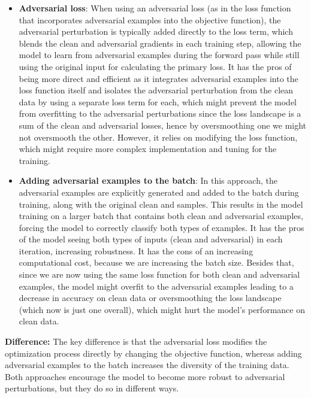 \documentclass{article}
\begin{document}
\begin{itemize}
    \item \textbf{Adversarial loss}: When using an adversarial loss (as in the loss function that incorporates adversarial examples
    into the objective function), the adversarial perturbation is typically added directly to the loss term, which blends
    the clean and adversarial gradients in each training step, allowing the model to learn from adversarial examples
    during the forward pass while still using the original input for calculating the primary loss. It has the pros of
    being more direct and efficient as it integrates adversarial examples into the loss function itself and isolates
    the adversarial perturbation from the clean data by using a separate loss term for each, which might prevent the model
    from overfitting to the adversarial perturbations since the loss landscape is a sum of the clean and adversarial losses, 
    hence by oversmoothing one we might not oversmooth the other.
    However, it relies on modifying the loss function, which might require more complex implementation and tuning for the training. 

    \item \textbf{Adding adversarial examples to the batch}: In this approach, the adversarial examples are explicitly
    generated and added to the batch during training, along with the original clean and samples. This results in the model
    training on a larger batch that contains both clean and adversarial examples, forcing the model to correctly classify
    both types of examples. It has the pros of the model seeing both types of inputs (clean and adversarial) in each
    iteration, increasing robustness. It has the cons of an increasing computational cost, because we are increasing
    the batch size. Besides that, since we are now using the same loss function for both clean and adversarial examples,
    the model might overfit to the adversarial examples leading to a decrease in accuracy on clean data or oversmoothing
    the loss landscape (which now is just one overall), which might hurt the model's performance on clean data.
\end{itemize}

\textbf{Difference:} The key difference is that the adversarial loss modifies the optimization process directly by changing the objective function, whereas adding adversarial examples to the batch increases the diversity of the training data. Both approaches encourage the model to become more robust to adversarial perturbations, but they do so in different ways.
\end{document}
